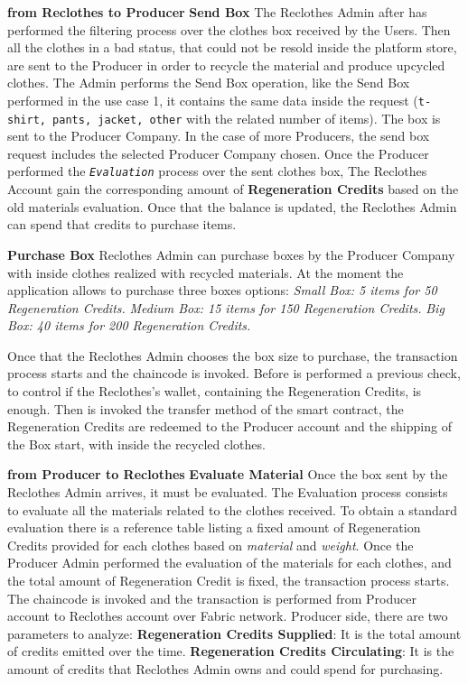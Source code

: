 \begin{outline}[enumerate]
    \1 \textbf{from Reclothes to Producer}   
    \2 \textbf{Send Box}
    \3 The Reclothes Admin after has performed the filtering process over the clothes box received by the Users. 
    Then all the clothes in a bad status, that could not be resold inside the platform store, are sent to the 
    Producer in order to recycle the material and produce upcycled clothes. The Admin performs the Send Box 
    operation, like the Send Box performed in the use case 1, it contains the same data inside the request 
    (\texttt{t-shirt, pants, jacket, other} with the related number of items). The box is sent to the Producer 
    Company. In the case of more Producers, the send box request includes the selected Producer Company chosen.
    \3 Once the Producer performed the \textit{\texttt{Evaluation}} process over the sent clothes box, 
    The Reclothes Account gain the corresponding amount of \textbf{Regeneration Credits} based on the 
    old materials evaluation. Once that the balance is updated, the Reclothes Admin can spend that 
    credits to purchase items. 
    
    \2 \textbf{Purchase Box}
    \3 Reclothes Admin can purchase boxes by the Producer Company with inside clothes realized with recycled 
    materials. At the moment the application allows to purchase three boxes options: 
    \4 \textit{Small Box: 5 items for 50 Regeneration Credits.}
    \4 \textit{Medium Box: 15 items for 150 Regeneration Credits.} 
    \4 \textit{Big Box: 40 items for 200 Regeneration Credits.}

    \3 Once that the Reclothes Admin chooses the box size to purchase, the transaction process starts and the 
    chaincode is invoked. Before is performed a previous check, to control if the Reclothes's wallet, containing the 
    Regeneration Credits, is enough. Then is invoked the transfer method of the smart contract, the Regeneration Credits are 
    redeemed to the Producer account and the shipping of the Box start, with inside the recycled clothes.       

    \1 \textbf{from Producer to Reclothes}
    \2 \textbf{Evaluate Material}
    \3 Once the box sent by the Reclothes Admin arrives, it must be evaluated. The Evaluation process
    consists to evaluate all the materials related to the clothes received. To obtain a standard evaluation
    there is a reference table listing a fixed amount of Regeneration Credits provided for
    each clothes based on \textit{material} and \textit{weight}. Once the Producer Admin performed 
    the evaluation of the materials for each clothes, and the total amount of Regeneration Credit is fixed,
    the transaction process starts. The chaincode is invoked and the transaction is performed from Producer account
    to Reclothes account over Fabric network. Producer side, there are two parameters to analyze:
    \4 \textbf{Regeneration Credits Supplied}: It is the total amount of credits emitted over the time.
    \4 \textbf{Regeneration Credits Circulating}: It is the amount of credits that Reclothes Admin
    owns and could spend for purchasing. 
\end{outline}


